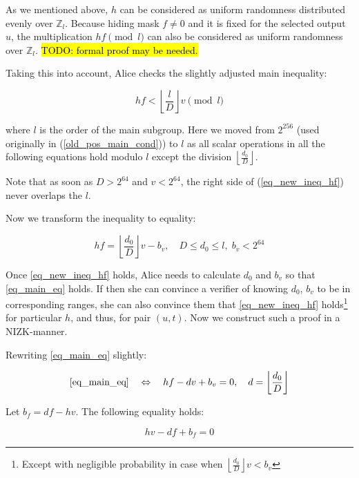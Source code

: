 \documentclass{article}
\newcommand{\floor}[1]{\left\lfloor #1 \right\rfloor}
\numberwithin{figure}{section}
\begin{document}
As we mentioned above, $h$ can be considered as uniform randomness distributed evenly over $\mathbb{Z}_l$. Because hiding mask $f \neq 0$ and it is fixed for the selected output $u$, the multiplication $hf \pmod{l}$ can also be considered as uniform randomness over $\mathbb{Z}_l$. \hl{TODO: formal proof may be needed.}

Taking this into account, Alice checks the slightly adjusted main inequality:

\begin{equation} \label{eq_new_ineq_hf}
    hf < \floor{\frac{l}{D}}v \pmod l
\end{equation}

where $l$ is the order of the main subgroup. Here we moved from $2^{256}$ (used originally in (\ref{old_pos_main_cond})) to $l$ as all scalar operations in all the following equations hold modulo $l$ except the division $\floor{\frac{d_0}{D}}$.

Note that as soon as $D > 2^{64}$ and $v < 2^{64}$, the right side of (\ref{eq_new_ineq_hf}) never overlaps the $l$.

Now we transform the inequality to equality:

\begin{equation} \label{eq_main_eq}
    hf = \floor{\frac{d_0}{D}} v - b_v, \quad D \leq d_0 \leq l, \; b_v < 2^{64}
\end{equation}

Once \eqref{eq_new_ineq_hf} holds, Alice needs to calculate $d_0$ and $b_v$ so that \eqref{eq_main_eq} holds. If then she can convince a verifier of knowing $d_0$, $b_v$ to be in corresponding ranges, she can also convince them that \eqref{eq_new_ineq_hf} holds\footnote{Except with negligible probability in case when $\floor{\frac{d_0}{D}}v < b_v$} for particular $h$, and thus, for pair $(u, t)$. Now we construct such a proof in a NIZK-manner.

Rewriting \eqref{eq_main_eq} slightly:

\begin{equation} \label{eq_part_g}
    \eqref{eq_main_eq} \quad \Leftrightarrow \quad hf - dv + b_v = 0, \quad d = \floor{\frac{d_0}{D}}
\end{equation}

Let $b_f = df - hv$. The following equality holds:

\begin{equation} \label{eq_part_h}
    hv - df + b_f = 0
\end{equation}
\end{document}
